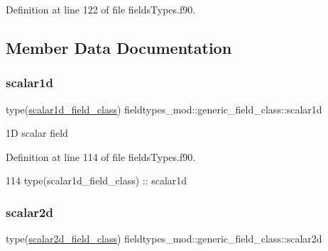 Definition at line 122 of file fields\+Types.\+f90.



\subsection{Member Data Documentation}
\mbox{\label{structfieldtypes__mod_1_1generic__field__class_ab28f23e646f7cfe4a42d6dc47a896bf9}} 
\subsubsection{\texorpdfstring{scalar1d}{scalar1d}}
{\footnotesize\ttfamily type(\mbox{\hyperlink{structfieldtypes__mod_1_1scalar1d__field__class}{scalar1d\+\_\+field\+\_\+class}}) fieldtypes\+\_\+mod\+::generic\+\_\+field\+\_\+class\+::scalar1d\hspace{0.3cm}{\ttfamily [private]}}



1D scalar field 



Definition at line 114 of file fields\+Types.\+f90.


\begin{DoxyCode}
114         \textcolor{keywordtype}{type}(scalar1d\_field\_class) :: scalar1d
\end{DoxyCode}
\mbox{\label{structfieldtypes__mod_1_1generic__field__class_ad4d960a63ab944d31c3a5c7538418d59}} 
\subsubsection{\texorpdfstring{scalar2d}{scalar2d}}
{\footnotesize\ttfamily type(\mbox{\hyperlink{structfieldtypes__mod_1_1scalar2d__field__class}{scalar2d\+\_\+field\+\_\+class}}) fieldtypes\+\_\+mod\+::generic\+\_\+field\+\_\+class\+::scalar2d\hspace{0.3cm}{\ttfamily [private]}}



